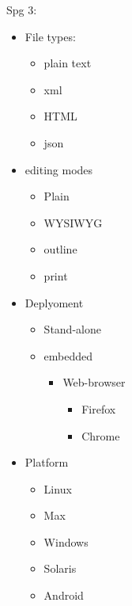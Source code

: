 \documentclass[a4, 10pt]{article}
\begin{document}
Spg 3:
\begin{itemize}
	\item File types:
		\begin{itemize}
			\item plain text
			\item xml
			\item HTML
			\item json
		\end{itemize}
	\item editing modes
	\begin{itemize}
		\item Plain
		\item WYSIWYG
		\item outline
		\item print
	\end{itemize}
	\item Deplyoment
	\begin{itemize}
		\item Stand-alone
		\item embedded
		\begin{itemize}
			\item Web-browser
			\begin{itemize}
				\item Firefox
				\item Chrome
			\end{itemize}
		\end{itemize}
	\end{itemize}

	\item Platform
	\begin{itemize}
		\item Linux
		\item Max 
		\item Windows
		\item Solaris
		\item Android
	\end{itemize}
\end{itemize}
\end{document}
